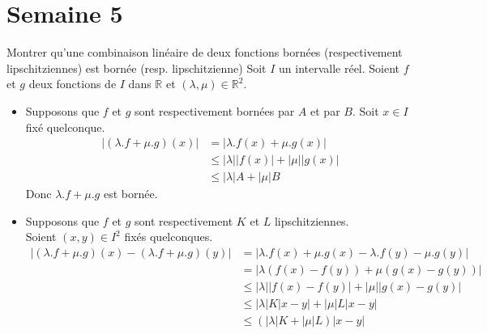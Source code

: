 \documentclass{article}
\renewenvironment{question_kholle}[2][ ]
{
	\subsection{\texorpdfstring{#2}{}}
	\notblank{#1}
	{
		\noindent #1
		\bigbreak
	}
	{}
	\begin{proof}
}
{
	\end{proof}
}
\begin{document}
\pagebreak\section{Semaine 5}

\begin{question_kholle}{Montrer qu'une combinaison linéaire de deux fonctions bornées (respectivement lipschitziennes) est bornée (resp. lipschitzienne)}
  Soit $I$ un intervalle réel.
  Soient $f$ et $g$ deux fonctions de $I$ dans $\mathbb{R}$ et $(\lambda, \mu) \in \mathbb{R}^2$.
  \begin{itemize}[label=$\lozenge$]
    \item Supposons que $f$ et $g$ sont respectivement bornées par $A$ et par $B$.
          Soit $x \in I$ fixé quelconque.
          \begin{align*}
            \Big| (\lambda.f + \mu.g)(x) \Big| & = \Big| \lambda.f(x) + \mu.g(x) \Big|                                             \\
                                               & \leqslant \big| \lambda \big|  \big|f(x)\big| + \big| \mu \big|  \big| g(x) \big| \\
                                               & \leqslant \big| \lambda \big| A + \big| \mu \big| B
          \end{align*}
          Donc $\lambda.f + \mu.g$ est bornée.
    \item Supposons que $f$ et $g$ sont respectivement $K$ et $L$ lipschitziennes.\\
          Soient $(x, y) \in I^2$ fixés quelconques.
          \begin{align*}
            \Big| (\lambda.f + \mu.g)(x) - (\lambda.f + \mu.g)(y)\Big| & = \Big| \lambda.f(x) + \mu.g(x) - \lambda.f(y) - \mu.g(y) \Big|                                   \\
                                                                       & = \Big| \lambda(f(x) - f(y)) + \mu(g(x) - g(y)) \Big|                                             \\
                                                                       & \leqslant \Big| \lambda  \Big|  \Big| f(x) - f(y) \Big| + \Big| \mu \Big|  \Big|g(x) - g(y) \Big| \\
                                                                       & \leqslant \Big| \lambda  \Big|  K \Big| x-y \Big| + \Big| \mu  \Big| L  \Big| x - y \Big|         \\
                                                                       & \leqslant (|\lambda| K + |\mu|L ) |x - y|
          \end{align*}
  \end{itemize}
\end{question_kholle}
\end{document}
